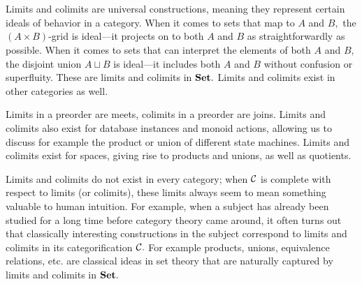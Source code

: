 \documentclass[../main/CT4S-EN-RU]{subfiles}
\begin{document}
\section{}

\begin{blockENG}
Limits and colimits are universal constructions, meaning they represent certain ideals of behavior in a category. When it comes to sets that map to $A$ and $B,$ the $(A\times B)$-grid is ideal—it projects on to both $A$ and $B$ as straightforwardly as possible. When it comes to sets that can interpret the elements of both $A$ and $B,$ the disjoint union $A\sqcup B$ is ideal—it includes both $A$ and $B$ without confusion or superfluity. These are limits and colimits in ${\mathbf{Set}}.$ Limits and colimits exist in other categories as well.
\end{blockENG}

\begin{blockRUS}
\end{blockRUS}

\begin{blockENG}
Limits in a preorder are meets, colimits in a preorder are joins. Limits and colimits also exist for database instances and monoid actions, allowing us to discuss for example the product or union of different state machines. Limits and colimits exist for spaces, giving rise to products and unions, as well as quotients.
\end{blockENG}

\begin{blockRUS}
\end{blockRUS}

\begin{blockENG}
Limits and colimits do not exist in every category; when $\mathcal{C}$ is complete with respect to limits (or colimits), these limits always seem to mean something valuable to human intuition. For example, when a subject has already been studied for a long time before category theory came around, it often turns out that classically interesting constructions in the subject correspond to limits and colimits in its categorification $\mathcal{C}.$ For example products, unions, equivalence relations, etc. are classical ideas in set theory that are naturally captured by limits and colimits in ${\mathbf{Set}}.$ 
\end{blockENG}

\begin{blockRUS}
\end{blockRUS}
\end{document}
